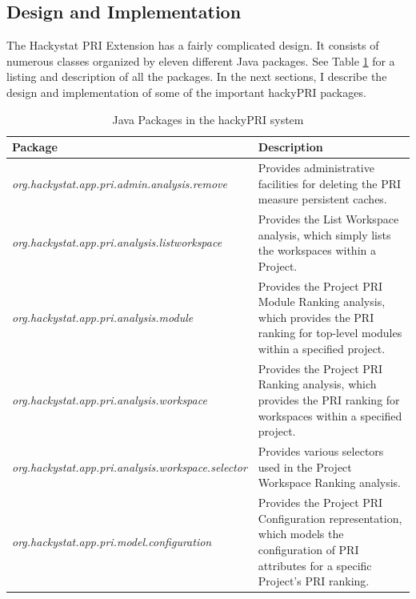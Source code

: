 \subsection{Design and Implementation}
The Hackystat PRI Extension has a fairly complicated design. It consists of
numerous classes organized by eleven different Java packages. See Table
\ref{table:hackyPRI-packagestructure} for a listing and description of all
the packages. In the next sections, I describe the design and
implementation of some of the important hackyPRI packages.

\begin{table}[htbp]
  \begin{center}
    \caption{Java Packages in the hackyPRI system}
    \label{table:hackyPRI-packagestructure}
    \begin{tabular}{|p{8.0cm}|p{7.0cm}|} \hline
      {\bf Package} & {\bf Description} \\ \hline

\small{}\emph{org.hackystat.app.pri.admin.analysis.remove} &
\small{}Provides administrative facilities for deleting the PRI measure
persistent caches. \\ \hline 

\small{}\emph{org.hackystat.app.pri.analysis.listworkspace} &
\small{}Provides the List Workspace analysis, which simply lists the
workspaces within a Project. \\ \hline 
 
\small{}\emph{org.hackystat.app.pri.analysis.module} & \small{}Provides
the Project PRI Module Ranking analysis, which provides the PRI ranking for
top-level modules within a specified project. \\ \hline

\small{}\emph{org.hackystat.app.pri.analysis.workspace} & \small{}Provides
the Project PRI Ranking analysis, which provides the PRI ranking for
workspaces within a specified project. \\ \hline

\small{}\emph{org.hackystat.app.pri.analysis.workspace.selector} &
\small{}Provides various selectors used in the Project Workspace Ranking
analysis. \\ \hline 

\small{}\emph{org.hackystat.app.pri.model.configuration} & \small{}Provides
the Project PRI Configuration representation, which models the
configuration of PRI attributes for a specific Project's PRI ranking. \\
\hline  


\end{tabular}
\end{center}
\end{table}
